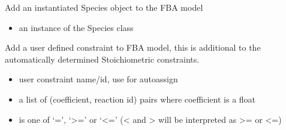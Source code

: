 \documentclass[letterpaper,10pt,english]{sphinxmanual}
\begin{document}
\begin{fulllineitems}
\begin{fulllineitems}
\begin{itemize}
\end{itemize}

\end{fulllineitems}


\begin{fulllineitems}
\label{\detokenize{modules_doc:cbmpy.CBModel.Model.addSpecies}}
\pysigstartsignatures
{}
\pysigstopsignatures
\sphinxAtStartPar
Add an instantiated Species object to the FBA model
\begin{itemize}
\item {} 
\sphinxAtStartPar
{} an instance of the Species class

\end{itemize}

\end{fulllineitems}


\begin{fulllineitems}
\label{\detokenize{modules_doc:cbmpy.CBModel.Model.addUserConstraint}}
\pysigstartsignatures
{}
\pysigstopsignatures
\sphinxAtStartPar
Add a user defined constraint to FBA model, this is additional to the automatically determined Stoichiometric constraints.
\begin{itemize}
\item {} 
\sphinxAtStartPar
{} user constraint name/id, use  for auto\sphinxhyphen{}assign

\item {} 
\sphinxAtStartPar
{} a list of (coefficient, reaction id) pairs where coefficient is a float

\item {} 
\sphinxAtStartPar
{} is one of ‘=’, ‘\textgreater{}=’ or ‘\textless{}=’ (\textless{} and \textgreater{} will be interpreted as \textgreater{}= or \textless{}=)


\end{itemize}
\end{fulllineitems}
\end{fulllineitems}
\end{document}

